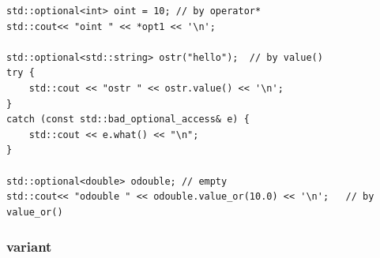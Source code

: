 \documentclass[a4paper,11pt,twoside]{book}
\begin{document}
\begin{itemize}
\begin{lstlisting}
std::optional<int> oint = 10; // by operator*
std::cout<< "oint " << *opt1 << '\n';

std::optional<std::string> ostr("hello");  // by value()
try {
	std::cout << "ostr " << ostr.value() << '\n';  
}
catch (const std::bad_optional_access& e) {
	std::cout << e.what() << "\n";
}

std::optional<double> odouble; // empty
std::cout<< "odouble " << odouble.value_or(10.0) << '\n';	// by value_or()
\end{lstlisting}	
\end{itemize}

\subsubsection{variant}
\end{document}
